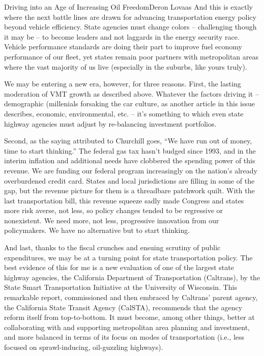 \documentclass[10pt]{papertex}
\begin{document}
\begin{news}{2}{Driving into an Age of Increasing Oil Freedom}{Deron Lovaas}{}{}
And this is exactly where the next battle lines are drawn for advancing 
transportation energy policy beyond vehicle efficiency. State agencies must 
change colors – challenging though it may be – to become leaders and not 
laggards in the energy security race. Vehicle performance standards are doing 
their part to improve fuel economy performance of our fleet, yet states remain 
poor partners with metropolitan areas where the vast majority of us live 
(especially in the suburbs, like yours truly).

We may be entering a new era, however, for three reasons. First, the lasting 
moderation of VMT growth as described above. Whatever the factors driving it – 
demographic (millenials forsaking the car culture, as another article in this 
issue describes, economic, environmental, etc. – it’s something to which even 
state highway agencies must adjust by re-balancing investment portfolios.

Second, as the saying attributed to Churchill goes, “We have run out of money, 
time to start thinking.” The federal gas tax hasn’t budged since 1993, and in 
the interim inflation and additional needs have clobbered the spending power 
of this revenue. We are funding our federal program increasingly on the 
nation’s already overburdened credit card. States and local jurisdictions are 
filling in some of the gap, but the revenue picture for them is a threadbare 
patchwork quilt. With the last transportation bill, this revenue squeeze sadly 
made Congress and states more risk averse, not less, so policy changes tended 
to be regressive or nonexistent. We need more, not less, progressive 
innovation from our policymakers. We have no alternative but to start 
thinking.

And last, thanks to the fiscal crunches and ensuing scrutiny of public 
expenditures, we may be at a turning point for state transportation policy. 
The best evidence of this for me is a new evaluation of one of the largest 
state highway agencies, the California Department of Transportation 
(Caltrans), by the State Smart Transportation Initiative at the University of 
Wisconsin. This remarkable report, commissioned and then embraced by Caltrans’ 
parent agency, the California State Transit Agency (CalSTA), recommends that 
the agency reform itself from top-to-bottom. It must become, among other 
things, better at collaborating with and supporting metropolitan area planning 
and investment, and more balanced in terms of its focus on modes of 
transportation (i.e., less focused on sprawl-inducing, oil-guzzling highways).


\end{news}
\end{document}
